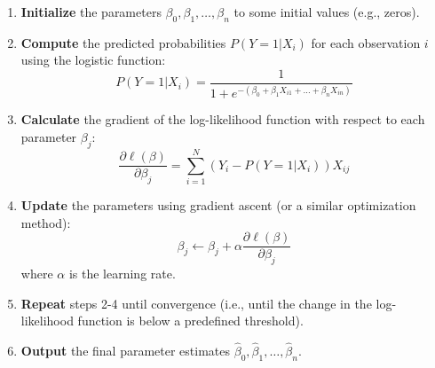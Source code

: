 \documentclass{article}
\begin{document}
\begin{enumerate}
    \item \textbf{Initialize} the parameters \( \beta_0, \beta_1, \dots, \beta_n \) to some initial values (e.g., zeros).
    \item \textbf{Compute} the predicted probabilities \( P(Y=1|X_i) \) for each observation \( i \) using the logistic function:
    \[
    P(Y=1|X_i) = \frac{1}{1 + e^{- (\beta_0 + \beta_1 X_{i1} + \dots + \beta_n X_{in})}}
    \]
    \item \textbf{Calculate} the gradient of the log-likelihood function with respect to each parameter \( \beta_j \):
    \[
    \frac{\partial \ell(\beta)}{\partial \beta_j} = \sum_{i=1}^{N} (Y_i - P(Y=1|X_i)) X_{ij}
    \]
    \item \textbf{Update} the parameters using gradient ascent (or a similar optimization method):
    \[
    \beta_j \leftarrow \beta_j + \alpha \frac{\partial \ell(\beta)}{\partial \beta_j}
    \]
    where \( \alpha \) is the learning rate.
    \item \textbf{Repeat} steps 2-4 until convergence (i.e., until the change in the log-likelihood function is below a predefined threshold).
    \item \textbf{Output} the final parameter estimates \( \hat{\beta}_0, \hat{\beta}_1, \dots, \hat{\beta}_n \).
\end{enumerate}
\end{document}
